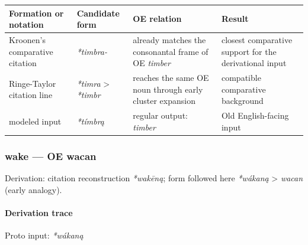 \documentclass[
  british,
  a4paper,
]{article}
\newcounter{none} %
\begin{document}
{\def\LTcaptype{none} %
\begin{longtable}[]{@{}
  >{\raggedright\arraybackslash}p{}
  >{\raggedright\arraybackslash}p{}
  >{\raggedright\arraybackslash}p{}
  >{\raggedright\arraybackslash}p{}@{}}
\toprule\noalign{}
\begin{minipage}[b]{\linewidth}\raggedright
Formation or notation
\end{minipage} & \begin{minipage}[b]{\linewidth}\raggedright
Candidate form
\end{minipage} & \begin{minipage}[b]{\linewidth}\raggedright
OE relation
\end{minipage} & \begin{minipage}[b]{\linewidth}\raggedright
Result
\end{minipage} \\
\midrule\noalign{}
\endhead
\bottomrule\noalign{}
\endlastfoot
Kroonen's comparative citation & \emph{*timbra-} & already matches the
consonantal frame of OE \emph{timber} & closest comparative support for
the derivational input \\
Ringe-Taylor citation line & \emph{*timra} \textgreater{} \emph{*timbr}
& reaches the same OE noun through early cluster expansion & compatible
comparative background \\
modeled input & \emph{*tímbrą} & regular output: \emph{timber} & Old
English-facing input \\
\end{longtable}
}

\subsubsection{wake --- OE wacan}\label{wake-oe-wacan}

Derivation: citation reconstruction \emph{*wakēną}; form followed here
\emph{*wákaną} \textgreater{} \emph{wacan} (early analogy).

\paragraph{Derivation trace}\label{derivation-trace-32}

Proto input: \emph{*wákaną}

\begingroup
\setlength{\fboxsep}{6pt}
\end{document}
